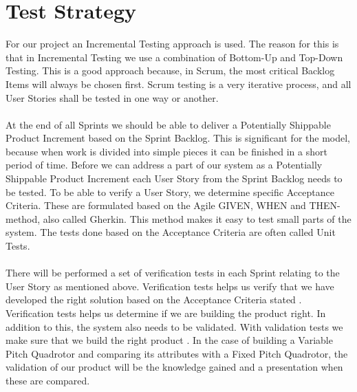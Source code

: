 \section{Test Strategy}
For our project an Incremental Testing approach is used. The reason for this is that in Incremental Testing we use a combination of Bottom-Up and Top-Down Testing. This is a good approach because, in Scrum, the most critical Backlog Items will always be chosen first. Scrum testing is a very iterative process, and all User Stories shall be tested in one way or another.\\
\\
At the end of all Sprints we should be able to deliver a Potentially Shippable Product Increment based on the Sprint Backlog. This is significant for the model, because when work is divided into simple pieces it can be finished in a short period of time. Before we can address a part of our system as a Potentially Shippable Product Increment each User Story from the Sprint Backlog needs to be tested. To be able to verify a User Story, we determine specific Acceptance Criteria. These are formulated based on the Agile GIVEN, WHEN and THEN-method, also called Gherkin. This method makes it easy to test small parts of the system. The tests done based on the Acceptance Criteria are often called Unit Tests.\\
\\
There will be performed a set of verification tests in each Sprint relating to the User Story as mentioned above. Verification tests helps us verify that we have developed the right solution based on the Acceptance Criteria stated \cite{ref1}. Verification tests helps us determine if we are building the product right. In addition to this, the system also needs to be validated. With validation tests we make sure that we build the right product \cite{ref5}. In the case of building a Variable Pitch Quadrotor and comparing its attributes with a Fixed Pitch Quadrotor, the validation of our product will be the knowledge gained and a presentation when these are compared. \\
\\
\newpage

